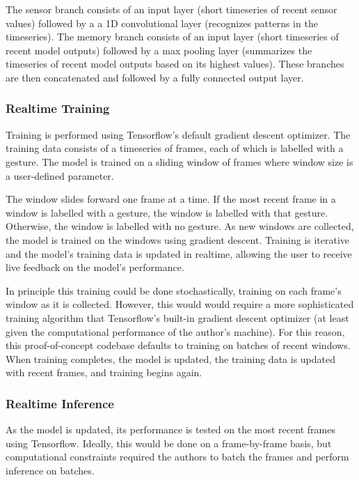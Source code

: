 \documentclass{article}
\begin{document}
The sensor branch consists of an input layer (short timeseries of recent sensor values) followed by a  a 1D convolutional layer (recognizes patterns in the timeseries). The memory branch consists of an input layer (short timeseries of recent model outputs) followed by a max pooling layer (summarizes the timeseries of recent model outputs based on its highest values). These branches are then concatenated and followed by a fully connected output layer. 

\subsubsection{Realtime Training}
Training is performed using Tensorflow's default gradient descent optimizer. The training data consists of a timeseries of frames, each of which is labelled with a gesture. The model is trained on a sliding window of frames where window size is a user-defined parameter.

The window slides forward one frame at a time. If the most recent frame in a window is labelled with a gesture, the window is labelled with that gesture. Otherwise, the window is labelled with no gesture. As new windows are collected, the model is trained on the windows using gradient descent. Training is iterative and the model's training data is updated in realtime, allowing the user to receive live feedback on the model's performance.

In principle this training could be done stochastically, training on each frame's window as it is collected. However, this would  would require a more sophisticated training algorithm that Tensorflow's built-in gradient descent optimizer (at least given the computational performance of the author's machine). For this reason, this proof-of-concept codebase defaults to training on batches of recent windows. When training completes, the model is updated, the training data is updated with recent frames, and training begins again.

\subsubsection{Realtime Inference}
As the model is updated, its performance is tested on the most recent frames using Tensorflow. Ideally, this would be done on a frame-by-frame basis, but computational constraints required the authors to batch the frames and perform inference on batches.
\end{document}
